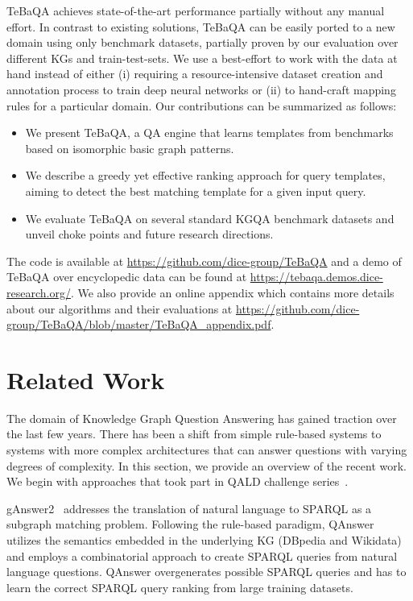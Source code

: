 \documentclass{IOS-Book-Article}
\begin{document}
TeBaQA achieves state-of-the-art performance partially without any manual effort. 
In contrast to existing solutions, TeBaQA can be easily ported to a new domain using only benchmark datasets, partially proven by our evaluation over different KGs and train-test-sets. We use a best-effort to work with the data at hand instead of either (i) requiring a resource-intensive dataset creation and annotation process to train deep neural networks or (ii) to hand-craft mapping rules for a particular domain.
Our contributions can be summarized as follows:
\begin{itemize}
    \item We present TeBaQA, a QA engine that learns templates from benchmarks based on isomorphic basic graph patterns.
    \item We describe a greedy yet effective ranking approach for query templates, aiming to detect the best matching template for a given input query. 
    \item We evaluate TeBaQA on several standard KGQA benchmark datasets and unveil choke points and future research directions.
    
\end{itemize}

The code is available at \url{https://github.com/dice-group/TeBaQA} and a demo of TeBaQA over encyclopedic data can be found at \url{https://tebaqa.demos.dice-research.org/}.
We also provide an online appendix which contains more details about our algorithms and their evaluations at \url{https://github.com/dice-group/TeBaQA/blob/master/TeBaQA_appendix.pdf}.



\section{Related Work}
The domain of Knowledge Graph Question Answering has gained traction over the last few years. There has been a shift from simple rule-based systems to systems with more complex architectures that can answer questions with varying degrees of complexity. In this section, we provide an overview of the recent work. 
We begin with approaches that took part in QALD challenge series~\cite{qald-7,qald-8,qald-9}.

gAnswer2~\cite{DBLP:conf/sigmod/ZouHWYHZ14} addresses the translation of natural language to SPARQL as a subgraph matching problem. 
Following the rule-based paradigm, QAnswer~\cite{DBLP:journals/semweb/DiefenbachGBSM20} utilizes the semantics embedded in the underlying KG (DBpedia and Wikidata) and employs a combinatorial approach to create SPARQL queries from natural language questions. QAnswer overgenerates possible SPARQL queries and has to learn the correct SPARQL query ranking from large training datasets.
\end{document}
